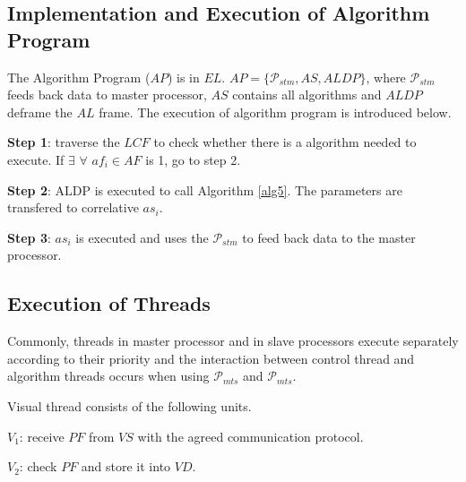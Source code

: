 \documentclass[journal,UTF8]{IEEEtran}
\begin{document}



\subsection{Implementation and Execution of Algorithm Program }
The Algorithm Program ($AP$) is in $EL$. $AP=\{\mathcal{P}_{stm}, AS, ALDP\}$, where $\mathcal{P}_{stm}$ feeds back data to master processor, $AS$ contains all algorithms and $ALDP$ deframe the $AL$ frame. The execution of algorithm program is introduced below.

\textbf{Step 1}: traverse the $LCF$ to check whether there is a algorithm needed to execute. If $\exists$ $\forall$ $af_i \in AF$ is 1, go to step 2.

\textbf{Step 2}: ALDP is executed to call Algorithm \ref{alg5}. The parameters are transfered to correlative $as_i$.

\textbf{Step 3}: $as_i$ is executed and uses the $\mathcal{P}_{stm}$ to feed back data to the master processor. 

\subsection{Execution of Threads}
 Commonly, threads in master processor and in slave processors execute separately according to their priority and the interaction between control thread and algorithm threads occurs when using $\mathcal{P}_{mts}$ and $\mathcal{P}_{mts}$. 
 
 Visual thread consists of the following units.
 
 \textbf{$V_1$}: receive $PF$ from $VS$ with the agreed communication protocol.
 
 \textbf{$V_2$}: check $PF$ and store it into $VD$. 
 
\end{document}
